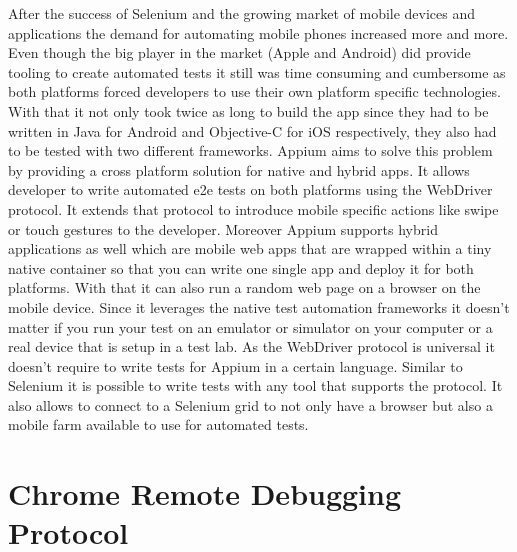 After the success of Selenium and the growing market of mobile devices and applications the
demand for automating mobile phones increased more and more. Even though the big player in
the market (Apple and Android) did provide tooling to create automated tests it still was
time consuming and cumbersome as both platforms forced developers to use their own platform
specific technologies. With that it not only took twice as long to build the app since they had
to be written in Java for Android and Objective-C for iOS respectively, they also had to be
tested with two different frameworks. Appium aims to solve this problem by providing a cross
platform solution for native and hybrid apps. It allows developer to write automated e2e tests
on both platforms using the WebDriver protocol. It extends that protocol to introduce mobile
specific actions like swipe or touch gestures to the developer. Moreover Appium supports hybrid
applications as well which are mobile web apps that are wrapped within a tiny native container
so that you can write one single app and deploy it for both platforms. With that it can also
run a random web page on a browser on the mobile device. Since it leverages the native test
automation frameworks it doesn't matter if you run your test on an emulator or simulator on your
computer or a real device that is setup in a test lab. As the WebDriver protocol is universal
it doesn't require to write tests for Appium in a certain language. Similar to Selenium it is
possible to write tests with any tool that supports the protocol. It also allows to connect
to a Selenium grid to not only have a browser but also a mobile farm available to use for
automated tests.

\section{Chrome Remote Debugging Protocol}

